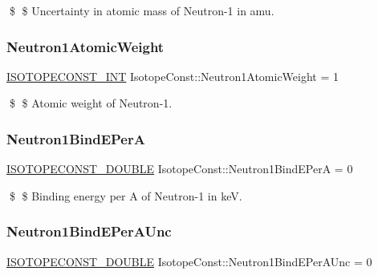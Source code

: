 \$ \$ Uncertainty in atomic mass of Neutron-\/1 in amu. \mbox{\label{group___isotope_const-_neutron-n1_ga9e590b8cce2d592193aeae35b302b826}} 
\subsubsection{\texorpdfstring{Neutron1\+Atomic\+Weight}{Neutron1AtomicWeight}}
{\footnotesize\ttfamily \mbox{\hyperlink{group___isotope_const-_macros_ga5f18360b3e99483a35c32d789e62621c}{I\+S\+O\+T\+O\+P\+E\+C\+O\+N\+S\+T\+\_\+\+I\+NT}} Isotope\+Const\+::\+Neutron1\+Atomic\+Weight = 1}

\$ \$ Atomic weight of Neutron-\/1. \mbox{\label{group___isotope_const-_neutron-n1_gac79335b1af3b2e7035323a89aa5135fd}} 
\subsubsection{\texorpdfstring{Neutron1\+Bind\+E\+PerA}{Neutron1BindEPerA}}
{\footnotesize\ttfamily \mbox{\hyperlink{group___isotope_const-_macros_ga8f45a7272ce02c0b4c65c44636ed719a}{I\+S\+O\+T\+O\+P\+E\+C\+O\+N\+S\+T\+\_\+\+D\+O\+U\+B\+LE}} Isotope\+Const\+::\+Neutron1\+Bind\+E\+PerA = 0}

\$ \$ Binding energy per A of Neutron-\/1 in keV. \mbox{\label{group___isotope_const-_neutron-n1_ga84f9e07f1fb2edddae152fff6fc49f76}} 
\subsubsection{\texorpdfstring{Neutron1\+Bind\+E\+Per\+A\+Unc}{Neutron1BindEPerAUnc}}
{\footnotesize\ttfamily \mbox{\hyperlink{group___isotope_const-_macros_ga8f45a7272ce02c0b4c65c44636ed719a}{I\+S\+O\+T\+O\+P\+E\+C\+O\+N\+S\+T\+\_\+\+D\+O\+U\+B\+LE}} Isotope\+Const\+::\+Neutron1\+Bind\+E\+Per\+A\+Unc = 0}

